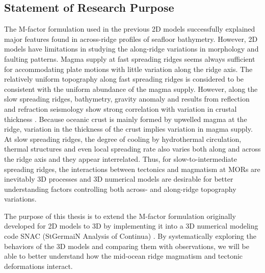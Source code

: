 \subsection{Statement of Research Purpose}
The M-factor formulation used in the previous 2D models \citep{Tucholke2008,Buck2005} successfully explained major features found in across-ridge profiles of seafloor bathymetry. However, 2D models have limitations in studying the along-ridge variations in morphology and faulting patterns. Magma supply at fast spreading ridges seems always sufficient for accommodating plate motions with little variation along the ridge axis. The relatively uniform topography along fast spreading ridges is considered to be consistent with the uniform abundance of the magma supply. However, along the slow spreading ridges, bathymetry, gravity anomaly and results from reflection and refraction seismology show strong correlation with variation in crustal thickness \citep{Ryan2009, Chen1999, Lin1990, Tolstoy1993}. Because oceanic crust is mainly formed by upwelled magma at the ridge, variation in the thickness of the crust implies variation in magma supply. At slow spreading ridges, the degree of cooling by hydrothermal circulation, thermal structures and even local spreading rate \citep{Baines2008} also varies both along and across the ridge axis and they appear interrelated. Thus, for slow-to-intermediate spreading ridges, the interactions between tectonics and magmatism at MORs are inevitably 3D processes and 3D numerical models are desirable for better understanding factors controlling both across- and along-ridge topography variations. 

The purpose of this thesis is to extend the M-factor formulation originally developed for 2D models to 3D by implementing it into a 3D numerical modeling code SNAC (StGermaiN Analysis of Continua) \citep{Choi2008}. By systematically exploring the behaviors of the 3D models and comparing them with observations, we will be able to better understand how the mid-ocean ridge magmatism and tectonic deformations interact. 


